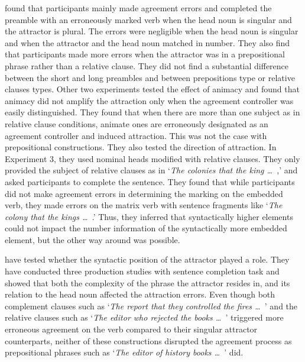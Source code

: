  found that participants mainly made agreement errors and completed the preamble with an erroneously marked verb when the head noun is singular and the attractor is plural. The errors were negligible when the head noun is singular and when the attractor and the head noun matched in number. They also find that participants made more errors when the attractor was in a prepositional phrase rather than a relative clause. They did not find a substantial difference between the short and long preambles and between prepositions type or relative clauses types. Other two experiments tested the effect of animacy and found that animacy did not amplify the attraction only when the agreement controller was easily distinguished. They found that when there are more than one subject as in relative clause conditions, animate ones are erroneously designated as an agreement controller and induced attraction. This was not the case with prepositional constructions. They also tested the direction of attraction. In Experiment 3, they used nominal heads modified with relative clauses. They only provided the subject of relative clauses as in `\emph{The colonies that the king \ldots{\ }},' and asked participants to complete the sentence. They found that while participants did not make agreement errors in determining the marking on the embedded verb, they made errors on the matrix verb with sentence fragments like  `\emph{The colony that the kings \ldots{\ }}.' Thus, they inferred that syntactically higher elements could not impact the number information of the syntactically more embedded element, but the other way around was possible.

 have tested whether the syntactic position of the attractor played a role. They have conducted three production studies with sentence completion task and showed that both the complexity of the phrase the attractor resides in, and its relation to the head noun affected the attraction errors. Even though both complement clauses such as `\emph{The report that they controlled the fires \ldots{\ }}' and the relative clauses such as `\emph{The editor who rejected the books \ldots{\ }}' triggered more erroneous agreement on the verb compared to their singular attractor counterparts, neither of these constructions disrupted the agreement process as prepositional phrases such as `\emph{The editor of history books \ldots{\ }}' did.

